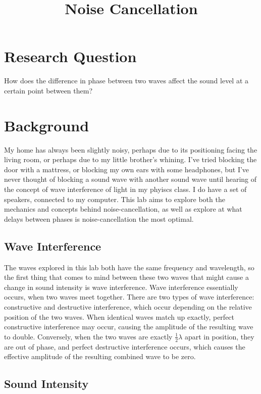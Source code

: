 \documentclass[index]{subfiles}
\begin{document}
\title{Noise Cancellation}
\date{}
\author{}
\maketitle

\section{Research Question}

How does the difference in phase between two waves affect the sound level at a certain point between them?

\section{Background}

My home has always been slightly noisy, perhaps due to its positioning facing the living room, or perhaps due to my little brother's whining. I've tried blocking the door with a mattress, or blocking my own ears with some headphones, but I've never thought of blocking a sound wave with another sound wave until hearing of the concept of wave interference of light in my phyiscs class. I do have a set of speakers, connected to my computer. This lab aims to explore both the mechanics and concepts behind noise-cancellation, as well as explore at what delays between phases is noise-cancellation the most optimal.

\subsection{Wave Interference}

The waves explored in this lab both have the same frequency and wavelength, so the first thing that comes to mind between these two waves that might cause a change in sound intensity is wave interference.
Wave interference essentially occurs, when two waves meet together. There are two types of wave interference: constructive and destructive interference, which occur depending on the relative position of the two waves. When identical waves match up exactly, perfect constructive interference may occur, causing the amplitude of the resulting wave to double. Conversely, when the two waves are exactly \(\frac{1}{2}\lambda\) apart in position, they are out of phase, and perfect destructive interference occurs, which causes the effective amplitude of the resulting combined wave to be zero. \cite{openstax}

\subsection{Sound Intensity}
\end{document}
